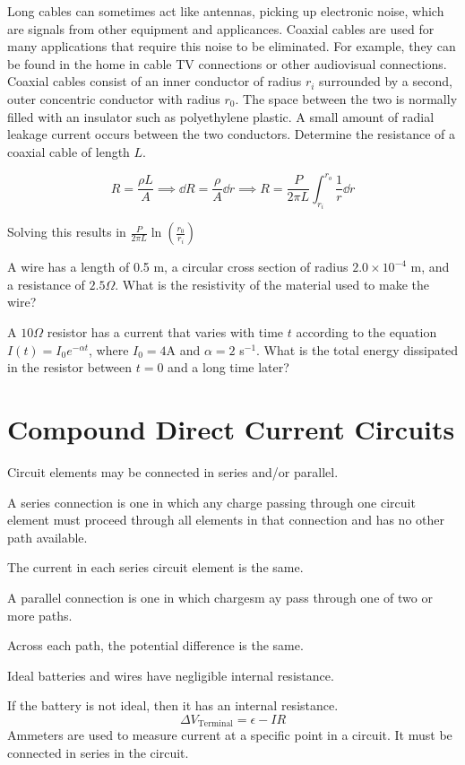 \documentclass[../em.tex]{subfiles}
\begin{document}
\begin{example}
    Long cables can sometimes act like antennas, picking up electronic noise, which are signals from other equipment and applicances. Coaxial cables are used for many applications 
    that require this noise to be eliminated. For example, they can be found in the home in cable TV connections or other audiovisual connections. Coaxial cables consist of an inner conductor 
    of radius $r_i$ surrounded by a second, outer concentric conductor with radius $r_0$. The space between the two is normally filled with an insulator such as polyethylene plastic.
    A small amount of radial leakage current occurs between the two conductors. Determine the resistance of a coaxial cable of length $L$.

    \[ R=\frac{\rho L}{A}\implies \dd R = \frac{\rho}{A}\dd r \implies R = \frac{P}{2\pi L}\int_{r_i}^{r_o}\frac{1}{r}\dd r \]

    Solving this results in $\frac{P}{2\pi L}\ln\left(\frac{r_0}{r_i}\right)$
\end{example}

\ex A wire has a length of 0.5 m, a circular cross section of radius $2.0\times 10^{-4}$ m, and a resistance of $2.5\Omega$. What is the resistivity of the material used to make the wire?

\ex A $10\Omega$ resistor has a current that varies with time $t$ according to the equation $I(t)=I_0e^{-\alpha t}$, where $I_0 = 4$A and $\alpha = 2$ s$^{-1}$. What is the total energy dissipated in the resistor between $t=0$ and a long time later?

\section{Compound Direct Current Circuits}
Circuit elements may be connected in series and/or parallel.

A series connection is one in which any charge passing through one circuit element must proceed through all elements in that connection and has no other path available.

The current in each series circuit element is the same.

A parallel connection is one in which chargesm ay pass through one of two or more paths.

Across each path, the potential difference is the same.

Ideal batteries and wires have negligible internal resistance.

If the battery is not ideal, then it has an internal resistance.
\[\Delta V_{\text{Terminal}}=\epsilon - IR \]
Ammeters are used to measure current at a specific point in a circuit. It must be connected in series in the circuit.
\end{document}
